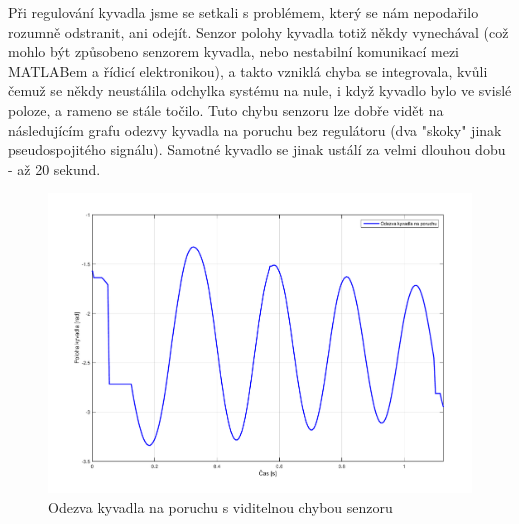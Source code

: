 \documentclass[11pt,a4paper]{article}
\begin{document}
Při regulování kyvadla jsme se setkali s problémem, který se nám nepodařilo rozumně odstranit, ani odejít. Senzor polohy kyvadla totiž někdy vynechával (což mohlo být způsobeno senzorem kyvadla, nebo nestabilní komunikací mezi MATLABem a řídicí elektronikou), a takto vzniklá chyba se integrovala, kvůli čemuž se někdy neustálila odchylka systému na nule, i když kyvadlo bylo ve svislé poloze, a rameno se stále točilo. Tuto chybu senzoru lze dobře vidět na následujícím grafu odezvy kyvadla na poruchu bez regulátoru (dva "skoky" jinak pseudospojitého signálu). Samotné kyvadlo se jinak ustálí za velmi dlouhou dobu - až 20 sekund.
\begin{figure}[H]
	\centering
    \includegraphics[scale=0.55]{odezva_kyvadlo}
    \caption{Odezva kyvadla na poruchu s viditelnou chybou senzoru}
\end{figure}
\end{document}
